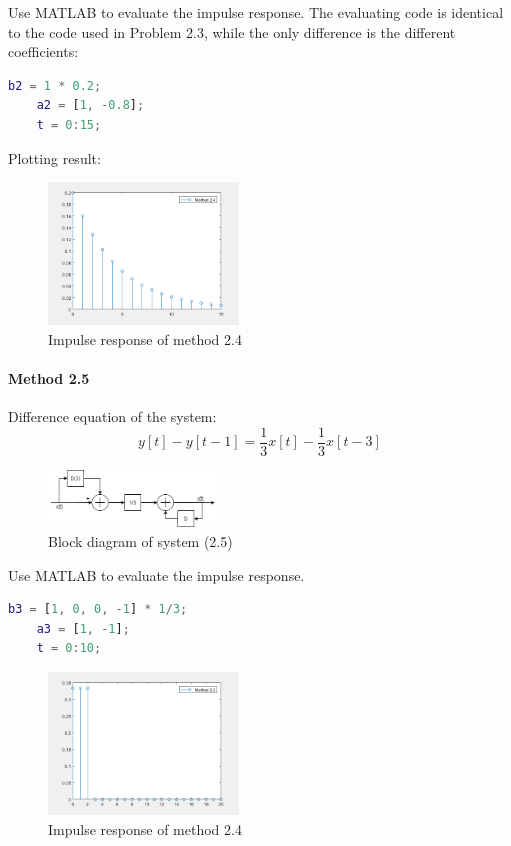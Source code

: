 \documentclass[conference]{IEEEtran}
\begin{document}
Use MATLAB to evaluate the impulse response. The evaluating code is identical to the code used in Problem 2.3, while the only difference is the different coefficients:
\begin{lstlisting}[language=matlab,style=matlab]
	b2 = 1 * 0.2;
	a2 = [1, -0.8];
	t = 0:15;
\end{lstlisting}

Plotting result:
\begin{figure}[htpb]
	\begin{center}
		\includegraphics[width=0.45\textwidth]{../matlab/q222_2.png}
		\caption{Impulse response of method 2.4}
		\label{fig:8}
	\end{center}
\end{figure}

\paragraph{Method 2.5}
Difference equation of the system:
\begin{equation}
	y[t]-y[t-1]=\frac{1}{3}x[t]-\frac{1}{3}x[t-3]
\end{equation}
\begin{figure}[htpb]
	\begin{center}
		\includegraphics[width=0.4\textwidth]{222-3.png}
		\caption{Block diagram of system (2.5)}
		\label{fig:9}
	\end{center}
\end{figure}

Use MATLAB to evaluate the impulse response.
\begin{lstlisting}[language=matlab,style=matlab]
	b3 = [1, 0, 0, -1] * 1/3;
	a3 = [1, -1];
	t = 0:10;
\end{lstlisting}
\begin{figure}[htpb]
	\begin{center}
		\includegraphics[width=0.45\textwidth]{../matlab/q222_3.png}
		\caption{Impulse response of method 2.4}
		\label{fig:10}
	\end{center}
\end{figure}
\end{document}
